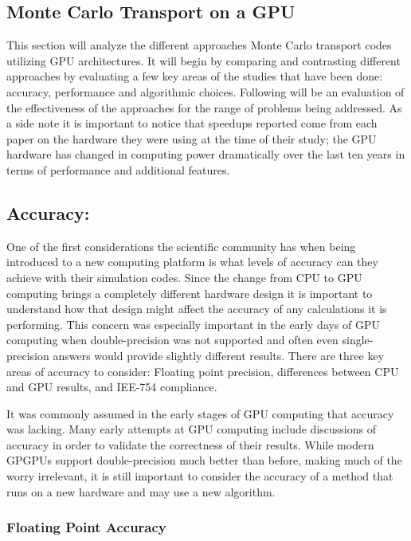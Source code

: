 \subsection{ \textbf{Monte Carlo Transport on a GPU}}

This section will analyze the different approaches Monte Carlo transport codes utilizing GPU architectures.
%
It will begin by comparing and contrasting different approaches by evaluating a few key areas of the studies that have been done: accuracy, performance and algorithmic choices.
%
Following will be an evaluation of the effectiveness of the approaches for the range of problems being addressed.
%
As a side note it is important to notice that speedups reported come from each paper on the hardware they were using at the time of their study; the GPU hardware has changed in computing power dramatically over the last ten years in terms of performance and additional features.

\subsection*{ \textbf{Accuracy:} }

One of the first considerations the scientific community has when being introduced to a new computing platform is what levels of accuracy can they achieve with their simulation codes.
%
Since the change from CPU to GPU computing brings a completely different hardware design it is important to understand how that design might affect the accuracy of any calculations it is performing.
%
This concern was especially important in the early days of GPU computing when double-precision was not supported and often even single-precision answers would provide slightly different results.
%
There are three key areas of accuracy to consider: Floating point precision, differences between CPU and GPU results, and IEE-754 compliance.
%

%
It was commonly assumed in the early stages of GPU computing that accuracy was lacking.
%
Many early attempts at GPU computing include discussions of accuracy in order to validate the correctness of their results.
%
While modern GPGPUs support double-precision much better than before, making much of the worry irrelevant, it is still important to consider the accuracy of a method that runs on a new hardware and may use a new algorithm.
%

\subsubsection*{\textbf{Floating Point Accuracy}}

